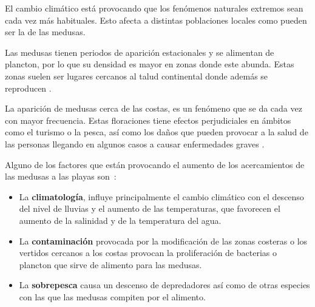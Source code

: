 
\begin{comment}
Descripción del contenido del trabajo y del estrucutra de la memoria y del resto de materiales entregados.
\end{comment}

El cambio climático está provocando que los fenómenos naturales extremos sean cada vez más habituales. Esto afecta a distintas poblaciones locales como pueden ser la de las medusas.

Las medusas tienen periodos de aparición estacionales y se alimentan de plancton, por lo que su densidad es mayor en zonas donde este abunda. Estas zonas suelen ser lugares cercanos al talud continental donde además se reproducen \cite{noauthor_proliferaciones_nodate}. %

La aparición de medusas cerca de las costas, es un fenómeno que se da cada vez con mayor frecuencia. Estas floraciones tiene efectos perjudiciales en ámbitos como el turismo o la pesca, así como los daños que pueden provocar a la salud de las personas llegando en algunos casos a causar enfermedades graves \cite{art:picaduras_1,art:picaduras_2}. 

Alguno de los factores que están provocando el aumento de los acercamientos de las medusas a las playas son~\cite{noauthor_proliferaciones_nodate,art:ArticuloCanepa_1}:
\begin{itemize}
	\item La \textbf{climatología}, influye principalmente el cambio climático con el descenso del nivel de lluvias y el aumento de las temperaturas, que favorecen el aumento de la salinidad y de la temperatura del agua. 
	\item La \textbf{contaminación} provocada por la modificación de las zonas costeras o los vertidos cercanos a los costas provocan la proliferación de bacterias o plancton que sirve de alimento para las medusas.
	\item La \textbf{sobrepesca} causa un descenso de depredadores así como de otras especies con las que las medusas compiten por el alimento.
\end{itemize}


